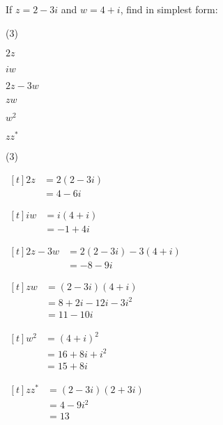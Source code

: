 \documentclass[11pt,a4paper]{book}
\begin{document}
\begin{example}

If $z=2-3i$ and $w=4+i$, find in simplest form:

\begin{tasks}(3)

\task  $2z$

\task  $iw$

\task  $2z-3w$

\task  $zw$

\task  $w^{2}$

\task  $zz^{*}$

\end{tasks}

\Solution

\begin{tasks}(3)

\task
$
\begin{aligned}[t]
2z & =2\left(2-3i\right)\\
 & =4-6i
\end{aligned}
$


\task
$
\begin{aligned}[t]
iw & =i\left(4+i\right)\\
 & =-1+4i
\end{aligned}
$

\task
$
\begin{aligned}[t]
2z-3w & =2\left(2-3i\right)-3\left(4+i\right)\\
 & =-8-9i
\end{aligned}
$


\task
$
\begin{aligned}[t]
zw & =\left(2-3i\right)\left(4+i\right)\\
 & =8+2i-12i-3i^{2}\\
 & =11-10i
\end{aligned}
$



\task
$
\begin{aligned}[t]
w^{2} & =\left(4+i\right)^{2}\\
 & =16+8i+i^{2}\\
 & =15+8i
\end{aligned}
$





\task
$
\begin{aligned}[t]
zz^{*} & =\left(2-3i\right)\left(2+3i\right)\\
 & =4-9i^{2}\\
 & =13
\end{aligned}
$

\end{tasks}

\end{example}
\end{document}
